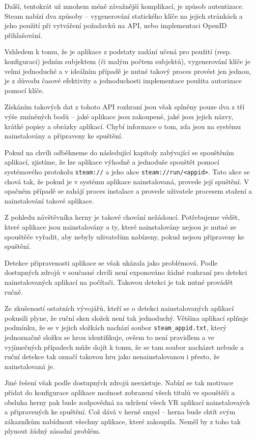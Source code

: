Další, tentokrát už mnohem méně závažnější komplikací, je způsob
autentizace. Steam nabízí dva způsoby
-- vygenerování statického klíče na jejich stránkách a jeho použití
při vytváření požadavků na API, nebo implementaci OpenID přihlašování. \autocite{swadocs}

Vzhledem k tomu, že je aplikace z podstaty zadání učená pro použití
(resp. konfiguraci) jedním subjektem (či malým počtem subjektů),
vygenerování klíče je velmi jednoduché a v ideálním případě je nutné
takový proces provést jen jednou, je z důvodu časové efektivity a 
jednoduchosti implementace použita autorizace pomocí klíče.

Získáním takových dat z tohoto API rozhraní jsou však splněny pouze dva
z tří výše zmíněných bodů -- jaké aplikace jsou zakoupené, jaké jsou
jejich názvy, krátké popisy a obrázky aplikací. Chybí informace o tom,
zda jsou na systému nainstalovány a připraveny ke spuštění.

Pokud na chvíli odběhneme do následující kapitoly zabývající se
spouštěním aplikací, zjistíme, že lze aplikace výhodně a jednoduše
spouštět pomocí systémového protokolu \texttt{steam://} a jeho akce
\texttt{steam://run/\textless{}appid\textgreater{}}. Tato akce se chová
tak, že pokud je v systému aplikace nainstalovaná, provede její
spuštění. V opačném případě se zahájí proces instalace a provede
uživatele procesem stažení a nainstalování takové aplikace. 

Z pohledu návštěvníka herny je takové chování nežádoucí. Potřebujeme
vědět, které aplikace jsou nainstalovány a ty, které nainstalovány
nejsou je nutné ze spouštěče vyřadit, aby nebyly uživatelům nabízeny,
pokud nejsou připraveny ke spuštění.

Detekce připravenosti aplikace se však ukázala jako
problémová. Podle dostupných zdrojů v současné chvíli není exponováno
žádné rozhraní pro detekci nainstalovaných aplikací na počítači. 
Takovou detekci je tak nutné provádět ručně. 

Ze zkušeností ostatních vývojářů, kteří se o detekci nainstalovaných aplikací pokusili
plyne, že ruční sken složek není tak jednoduchý. \autocite{hardgamedetection} Většina aplikací splňuje
podmínku, že se v jejich složkách nachází soubor
\texttt{steam\_appid.txt}, který jednoznačně složku se hrou
identifikuje, ovšem to není pravidlem a ve vyjímečných případech může
dojít k tomu, že se tam soubor nacházet nebude a ruční detekce tak 
označí takovou hru jako nenainstalovanou i přesto, že nainstalovaná je.

Jiné řešení však podle dostupných zdrojů neexistuje. Nabízí se tak
motivace přidat do konfigurace aplikace možnost zobrazení všech titulů
ve spouštěči a obsluha herny pak bude zodpovědná za udržení všech VR aplikací 
nainstalovaých a připravených ke spuštění. Což dává v herně smysl --
herna bude chtít svým zákazníkům nabídnout všechny aplikace, které
zakoupila. Neměl by z toho tak plynout žádný zásadní problém.

